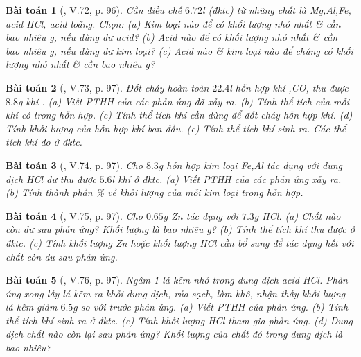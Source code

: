 \documentclass{article}
\newtheorem{baitoan}{Bài toán}
\begin{document}
\begin{baitoan}[\cite{Truong_BTNC_Hoa_Hoc_8_2022}, V.72, p. 96]
	Cần điều chế $6.72$\emph{l } (đktc) từ những chất là \emph{Mg,Al,Fe}, acid \emph{HCl}, acid \emph{} loãng. Chọn: (a) Kim loại nào để có khối lượng nhỏ nhất \& cần bao nhiêu \emph{g}, nếu dùng dư acid? (b) Acid nào để có khối lượng nhỏ nhất \& cần bao nhiêu \emph{g}, nếu dùng dư kim loại? (c) Acid nào \& kim loại nào để chúng có khối lượng nhỏ nhất \& cần bao nhiêu \emph{g}?
\end{baitoan}

\begin{baitoan}[\cite{Truong_BTNC_Hoa_Hoc_8_2022}, V.73, p. 97]
	Đốt cháy hoàn toàn $22.4$\emph{l} hỗn hợp khí \emph{,CO}, thu được $8.8$\emph{g} khí \emph{}. (a) Viết PTHH của các phản ứng đã xảy ra. (b) Tính thể tích của mỗi khí có trong hỗn hợp. (c) Tính thể tích khí \emph{} cần dùng để đốt cháy hỗn hợp khí. (d) Tính khối lượng của hỗn hợp khí ban đầu. (e) Tính thể tích khí \emph{} sinh ra. Các thể tích khí đo ở đktc.
\end{baitoan}

\begin{baitoan}[\cite{Truong_BTNC_Hoa_Hoc_8_2022}, V.74, p. 97]
	Cho $8.3$\emph{g} hỗn hợp kim loại \emph{Fe,Al} tác dụng với dung dịch \emph{HCl} dư thu được $5.6$\emph{l} khí ở đktc. (a) Viết PTHH của các phản ứng xảy ra. (b) Tính thành phần \% về khối lượng của mỗi kim loại trong hỗn hợp.
\end{baitoan}

\begin{baitoan}[\cite{Truong_BTNC_Hoa_Hoc_8_2022}, V.75, p. 97]
	Cho $0.65$\emph{g Zn} tác dụng với $7.3$\emph{g HCl}. (a) Chất nào còn dư sau phản ứng? Khối lượng là bao nhiêu \emph{g}? (b) Tính thể tích khí \emph{} thu được ở đktc. (c) Tính khối lượng \emph{Zn} hoặc khối lượng \emph{HCl} cần bổ sung để tác dụng hết với chất còn dư sau phản ứng.
\end{baitoan}

\begin{baitoan}[\cite{Truong_BTNC_Hoa_Hoc_8_2022}, V.76, p. 97]
	Ngâm 1 lá kẽm nhỏ trong dung dịch acid \emph{HCl}. Phản ứng xong lấy lá kẽm ra khỏi dung dịch, rửa sạch, làm khô, nhận thấy khối lượng lá kẽm giảm $6.5$\emph{g} so với trước phản ứng. (a) Viết PTHH của phản ứng. (b) Tính thể tích khí \emph{} sinh ra ở đktc. (c) Tính khối lượng \emph{HCl} tham gia phản ứng. (d) Dung dịch chất nào còn lại sau phản ứng? Khối lượng của chất đó trong dung dịch là bao nhiêu?
\end{baitoan}
\end{document}
